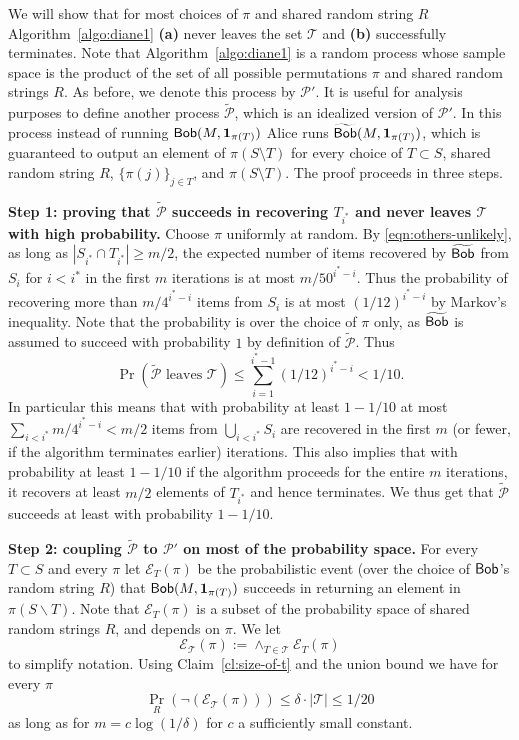 We will show that for most choices of $\pi$ and shared random string $R$ Algorithm~\ref{algo:diane1} {\bf (a)} never leaves the set $\mathcal{T}$ and {\bf (b)} successfully terminates.  Note that Algorithm~\ref{algo:diane1} is a random process whose sample space is the product of the set of all possible permutations $\pi$ and shared random strings $R$. As before, we denote this process by $\mathcal{P}'$. It is useful for analysis purposes to define another process $\widetilde{\mathcal{P}}$, which is an idealized version of $\mathcal{P}'$. In this process instead of running  $\mathsf{Bob}(M, \mathbf{1}_{\pi(T)})$ Alice runs  $\widetilde{\mathsf{Bob}}(M, \mathbf{1}_{\pi(T)})$, which is guaranteed to output an element of $\pi(S\setminus T)$ for every choice of  $T\subset S$, shared random string $R$, $\{\pi(j)\}_{j\in T}$, and $\pi(S\setminus T)$. The proof proceeds in three steps.



{\bf Step 1: proving that $\widetilde{\mathcal{P}}$ succeeds in recovering $T_{i^*}$ and never leaves $\mathcal{T}$ with high probability.}
Choose $\pi$ uniformly at random. By \eqref{eqn:others-unlikely}, as long as $|S_{i^*}\cap T_{i^*}|\geq m/2$, the expected number of items recovered by $\widetilde{\mathsf{Bob}}$ from $S_i$ for $i<i^*$ in the first $m$ iterations is at most $m/50^{i^*-i}$. Thus the probability of recovering more than $m/4^{i^*-i}$ items from $S_i$ is at most $(1/12)^{i^*-i}$ by Markov's inequality. Note that the probability is over the choice of $\pi$ only, as $\widetilde{\mathsf{Bob}}$ is assumed to succeed with probability $1$ by definition of $\widetilde{\mathcal{P}}$. 
Thus
$$
\Pr( \widetilde{\mathcal{P}}\text{~leaves~}\mathcal{T}) \le \sum_{i=1}^{i^*-1}\left(1/12\right)^{i^*-i} < 1/10.
$$
In particular this means that with probability at least $1-1/10$ at most $\sum_{i<i^*} m/4^{i^*-i}<m/2$ items from $\bigcup_{i<i^*} S_i$ are recovered in the first $m$ (or fewer, if the algorithm terminates earlier) iterations. This also implies that with probability at least $1-1/10$ if the algorithm proceeds for the entire $m$ iterations, it recovers at least $m/2$ elements of $T_{i^*}$ and hence terminates. We thus get that $\widetilde{\mathcal{P}}$ succeeds at least with probability $1-1/10$.

{\bf Step 2: coupling $\widetilde{\mathcal{P}}$ to $\mathcal{P}'$ on most of the probability space.}
For every $T\subset S$ and every $\pi$ let $\mathcal{E}_T(\pi)$ be the probabilistic event (over the choice of $\mathsf{Bob}$'s random string $R$) that $\mathsf{Bob}(M, \mathbf{1}_{\pi(T)})$ succeeds in returning an element in $\pi(S\backslash T)$. Note that $\mathcal{E}_T(\pi)$ is a subset of the probability space of shared random strings $R$, and depends on $\pi$. We let 
$$
\mathcal{E}_{\mathcal T}(\pi):=\wedge_{T\in\mathcal T} \mathcal E_T(\pi)
$$
to simplify notation. Using Claim~\ref{cl:size-of-t} and the union bound we have for every $\pi$
$$
\Pr_R(\neg(\mathcal E_{\mathcal T}(\pi))) \le \delta\cdot |\mathcal T|\leq 1/20
$$
as long as for $m = c\log(1/\delta)$ for $c$ a sufficiently small constant.

